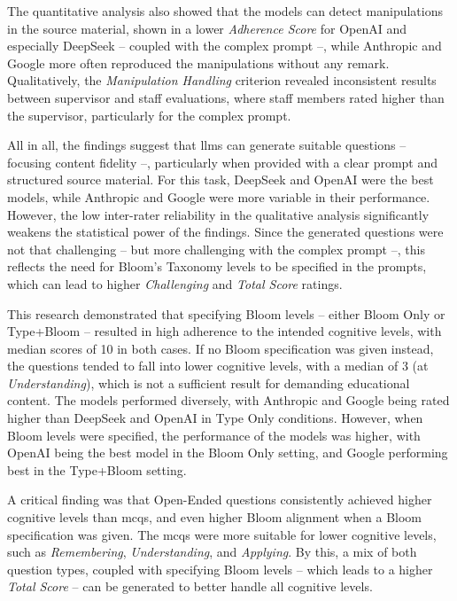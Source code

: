The quantitative analysis also showed that the models can detect manipulations in the source material, shown in a lower \textit{Adherence Score} for OpenAI and especially DeepSeek -- coupled with the complex prompt --, while Anthropic and Google more often reproduced the manipulations without any remark. Qualitatively, the \textit{Manipulation Handling} criterion revealed inconsistent results between supervisor and staff evaluations, where staff members rated higher than the supervisor, particularly for the complex prompt.

All in all, the findings suggest that \acp{llm} can generate suitable questions -- focusing content fidelity --, particularly when provided with a clear prompt and structured source material. For this task, DeepSeek and OpenAI were the best models, while Anthropic and Google were more variable in their performance. However, the low inter-rater reliability in the qualitative analysis significantly weakens the statistical power of the findings. Since the generated questions were not that challenging -- but more challenging with the complex prompt --, this reflects the need for Bloom's Taxonomy levels to be specified in the prompts, which can lead to higher \textit{Challenging} and \textit{Total Score} ratings.


This research demonstrated that specifying Bloom levels -- either Bloom Only or Type+Bloom -- resulted in high adherence to the intended cognitive levels, with median scores of 10 in both cases. If no Bloom specification was given instead, the questions tended to fall into lower cognitive levels, with a median of 3 (at \textit{Understanding}), which is not a sufficient result for demanding educational content. The models performed diversely, with Anthropic and Google being rated higher than DeepSeek and OpenAI in Type Only conditions. However, when Bloom levels were specified, the performance of the models was higher, with OpenAI being the best model in the Bloom Only setting, and Google performing best in the Type+Bloom setting.

A critical finding was that Open-Ended questions consistently achieved higher cognitive levels than \acp{mcq}, and even higher Bloom alignment when a Bloom specification was given. The \acp{mcq} were more suitable for lower cognitive levels, such as \textit{Remembering}, \textit{Understanding}, and \textit{Applying}. By this, a mix of both question types, coupled with specifying Bloom levels -- which leads to a higher \textit{Total Score} -- can be generated to better handle all cognitive levels.

